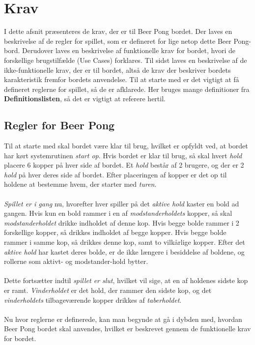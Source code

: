 \documentclass[Rapport/Rapport_main.tex]{subfiles}
\begin{document}
\section{Krav}
I dette afsnit præsenteres de krav, der er til Beer Pong bordet. Der laves en beskrivelse af de regler for spillet, som er defineret for lige netop dette Beer Pong-bord. Derudover laves en beskrivelse af funktionelle krav for bordet, hvori de forskellige brugstilfælde (Use Cases) forklares. Til sidst laves en beskrivelse af de ikke-funktionelle krav, der er til bordet, altså de krav der beskriver bordets karakteristik fremfor bordets anvendelse. Til at starte med er det vigtigt at få defineret reglerne for spillet, så de er afklarede. Her bruges mange definitioner fra \textbf{Definitionslisten}, så det er vigtigt at referere hertil.
\subsection{Regler for Beer Pong}\label{sec:rap_rules}
Til at starte med skal bordet være klar til brug, hvilket er opfyldt ved, at bordet har kørt systemrutinen \textit{start op}. Hvis bordet er klar til brug, så skal hvert \textit{hold} placere 6 kopper på hver side af bordet. Et \textit{hold} består af 2 brugere, og der er 2 \textit{hold} på hver deres side af bordet. Efter placeringen af kopper er det op til holdene at bestemme hvem, der starter med \textit{turen}.\\\\
\textit{Spillet er i gang} nu, hvorefter hver spiller på det \textit{aktive hold} kaster en bold ad gangen. Hvis kun en bold rammer i en af \textit{modstanderholdets} kopper, så skal \textit{modstanderholdet} drikke indholdet af denne kop. Hvis begge bolde rammer i 2 forskellige kopper, så drikkes indholdet af begge kopper. Hvis begge bolde rammer i samme kop, så drikkes denne kop, samt to vilkårlige kopper. Efter det \textit{aktive hold} har kastet deres bolde, er de ikke længere i besiddelse af boldene, og rollerne som aktivt- og modstander-hold bytter.\\\\
Dette fortsætter indtil \textit{spillet er slut}, hvilket vil sige, at en af holdenes sidste kop er ramt. \textit{Vinderholdet} er det hold, der rammer den sidste kop, og det \textit{vinderholdets} tilbageværende kopper drikkes af \textit{taberholdet}.\\\\
Nu hvor reglerne er definerede, kan man begynde at gå i dybden med, hvordan Beer Pong bordet skal anvendes, hvilket er beskrevet gennem de funktionelle krav for bordet.
\end{document}
